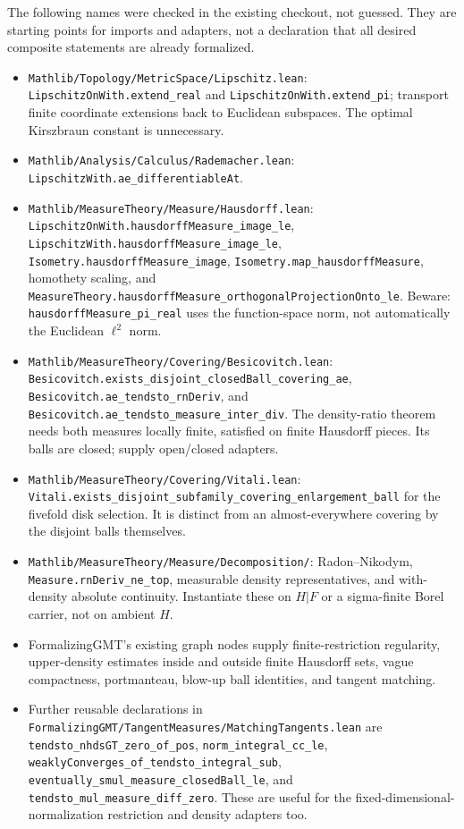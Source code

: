 The following names were checked in the existing checkout, not guessed.
They are starting points for imports and adapters, not a declaration that
all desired composite statements are already formalized.
\begin{itemize}
\item \texttt{Mathlib/Topology/MetricSpace/Lipschitz.lean}:
\texttt{LipschitzOnWith.extend\_real} and
\texttt{LipschitzOnWith.extend\_pi}; transport finite coordinate extensions
back to Euclidean subspaces. The optimal Kirszbraun constant is unnecessary.
\item \texttt{Mathlib/Analysis/Calculus/Rademacher.lean}:
\texttt{LipschitzWith.ae\_differentiableAt}.
\item \texttt{Mathlib/MeasureTheory/Measure/Hausdorff.lean}:
\texttt{LipschitzOnWith.hausdorffMeasure\_image\_le},
\texttt{LipschitzWith.hausdorffMeasure\_image\_le},
\texttt{Isometry.hausdorffMeasure\_image},
\texttt{Isometry.map\_hausdorffMeasure}, homothety scaling, and
\texttt{MeasureTheory.hausdorffMeasure\_orthogonalProjectionOnto\_le}.
Beware: \texttt{hausdorffMeasure\_pi\_real} uses the function-space norm,
not automatically the Euclidean $\ell^2$ norm.
\item \texttt{Mathlib/MeasureTheory/Covering/Besicovitch.lean}:
\texttt{Besicovitch.exists\_disjoint\_closedBall\_covering\_ae},
\texttt{Besicovitch.ae\_tendsto\_rnDeriv}, and
\texttt{Besicovitch.ae\_tendsto\_measure\_inter\_div}.
The density-ratio theorem needs both measures locally finite, satisfied on
finite Hausdorff pieces. Its balls are closed; supply open/closed adapters.
\item \texttt{Mathlib/MeasureTheory/Covering/Vitali.lean}:
\texttt{Vitali.exists\_disjoint\_subfamily\_covering\_enlargement\_ball}
for the fivefold disk selection. It is distinct from an almost-everywhere
covering by the disjoint balls themselves.
\item \texttt{Mathlib/MeasureTheory/Measure/Decomposition/}:
Radon--Nikodym, \texttt{Measure.rnDeriv\_ne\_top}, measurable density
representatives, and with-density absolute continuity. Instantiate these on
$H|F$ or a sigma-finite Borel carrier, not on ambient $H$.
\item FormalizingGMT's existing graph nodes supply finite-restriction
regularity, upper-density estimates inside and outside finite Hausdorff sets,
vague compactness, portmanteau, blow-up ball identities, and tangent matching.
\item Further reusable declarations in
\texttt{FormalizingGMT/TangentMeasures/MatchingTangents.lean} are
\texttt{tendsto\_nhdsGT\_zero\_of\_pos},
\texttt{norm\_integral\_cc\_le},
\texttt{weaklyConverges\_of\_tendsto\_integral\_sub},
\texttt{eventually\_smul\_measure\_closedBall\_le}, and
\texttt{tendsto\_mul\_measure\_diff\_zero}. These are useful for the
fixed-dimensional-normalization restriction and density adapters too.
\end{itemize}

